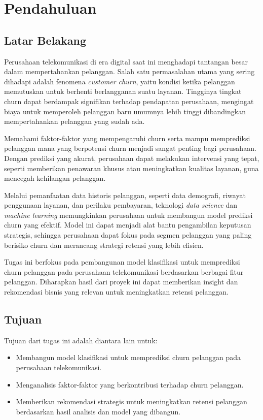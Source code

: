\section{Pendahuluan}
\subsection{Latar Belakang}

Perusahaan telekomunikasi di era digital saat ini menghadapi tantangan besar dalam mempertahankan pelanggan. Salah satu permasalahan utama yang sering dihadapi adalah fenomena \textit{customer churn}, yaitu kondisi ketika pelanggan memutuskan untuk berhenti berlangganan suatu layanan. Tingginya tingkat churn dapat berdampak signifikan terhadap pendapatan perusahaan, mengingat biaya untuk memperoleh pelanggan baru umumnya lebih tinggi dibandingkan mempertahankan pelanggan yang sudah ada.

Memahami faktor-faktor yang mempengaruhi churn serta mampu memprediksi pelanggan mana yang berpotensi churn menjadi sangat penting bagi perusahaan. Dengan prediksi yang akurat, perusahaan dapat melakukan intervensi yang tepat, seperti memberikan penawaran khusus atau meningkatkan kualitas layanan, guna mencegah kehilangan pelanggan.

Melalui pemanfaatan data historis pelanggan, seperti data demografi, riwayat penggunaan layanan, dan perilaku pembayaran, teknologi \textit{data science} dan \textit{machine learning} memungkinkan perusahaan untuk membangun model prediksi churn yang efektif. Model ini dapat menjadi alat bantu pengambilan keputusan strategis, sehingga perusahaan dapat fokus pada segmen pelanggan yang paling berisiko churn dan merancang strategi retensi yang lebih efisien.

Tugas ini berfokus pada pembangunan model klasifikasi untuk memprediksi churn pelanggan pada perusahaan telekomunikasi berdasarkan berbagai fitur pelanggan. Diharapkan hasil dari proyek ini dapat memberikan insight dan rekomendasi bisnis yang relevan untuk meningkatkan retensi pelanggan.
\newpage
\subsection{Tujuan}
Tujuan dari tugas ini adalah diantara lain untuk:

\begin{itemize}
    \item Membangun model klasifikasi untuk memprediksi churn pelanggan pada perusahaan telekomunikasi.
    \item Menganalisis faktor-faktor yang berkontribusi terhadap churn pelanggan.
    \item Memberikan rekomendasi strategis untuk meningkatkan retensi pelanggan berdasarkan hasil analisis dan model yang dibangun.
\end{itemize}


